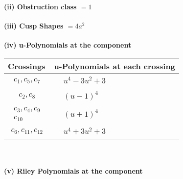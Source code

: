 \documentclass[1p]{elsarticle_modified}
\theoremstyle{definition}
\begin{document}
\flushleft \textbf{(ii) Obstruction class $= 1$}\\~\\
\flushleft \textbf{(iii) Cusp Shapes $= 4 a^2$}\\~\\
\newpage\renewcommand{\arraystretch}{1}
\flushleft \textbf{(iv) u-Polynomials at the component}\newline \\
\begin{tabular}{m{50pt}|m{274pt}}
Crossings & \hspace{64pt}u-Polynomials at each crossing \\
\hline $$\begin{aligned}c_{1},c_{5},c_{7}\end{aligned}$$&$\begin{aligned}
&u^4-3 u^2+3
\end{aligned}$\\
\hline $$\begin{aligned}c_{2},c_{8}\end{aligned}$$&$\begin{aligned}
&(u-1)^4
\end{aligned}$\\
\hline $$\begin{aligned}c_{3},c_{4},c_{9}\\c_{10}\end{aligned}$$&$\begin{aligned}
&(u+1)^4
\end{aligned}$\\
\hline $$\begin{aligned}c_{6},c_{11},c_{12}\end{aligned}$$&$\begin{aligned}
&u^4+3 u^2+3
\end{aligned}$\\
\hline
\end{tabular}\\~\\
\newpage\renewcommand{\arraystretch}{1}
\flushleft \textbf{(v) Riley Polynomials at the component}\newline \\
\end{document}
